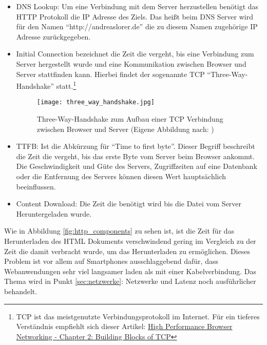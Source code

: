 			\begin{itemize}
				\item DNS Lookup: Um eine Verbindung mit dem Server herzustellen benötigt das HTTP Protokoll die IP Adresse des Ziels. Das heißt beim DNS Server wird für den Namen "`http://andreaslorer.de"' die zu diesem Namen zugehörige IP Adresse zurückgegeben.

				\item Initial Connection bezeichnet die Zeit die vergeht, bis eine Verbindung zum Server hergestellt wurde und eine Kommunikation zwischen Browser und Server stattfinden kann. Hierbei findet der sogenannte TCP "`Three-Way-Handshake"' statt.\footnote{TCP ist das meistgenutzte Verbindungsprotokoll im Internet. Für ein tieferes Verständnis empfiehlt sich dieser Artikel: \href{http://chimera.labs.oreilly.com/books/1230000000545/ch02.html}{High Performance Browser Networking - Chapter 2: Building Blocks of TCP}}

				\begin{figure}[htbp]
					\begin{center}
						\texttt{[image: three\_way\_handshake.jpg]}
						\caption{Three-Way-Handshake zum Aufbau einer TCP Verbindung zwischen Browser und Server (Eigene Abbildung nach: \autocite{bos})}
						\label{fig:three_way_handshake}
					\end{center}
				\end{figure}

				\item TTFB: Ist die Abkürzung für "`Time to first byte"'. Dieser Begriff beschreibt die Zeit die vergeht, bis das erste Byte vom Server beim Browser ankommt. Die Geschwindigkeit und Güte des Servers, Zugriffzeiten auf eine Datenbank oder die Entfernung des Servers können diesen Wert hauptsächlich beeinflussen.

				\item Content Download: Die Zeit die benötigt wird bis die Datei vom Server Heruntergeladen wurde.
			\end{itemize}

			Wie in Abbildung \ref{fig:http_components} zu sehen ist, ist die Zeit für das Herunterladen des HTML Dokuments verschwindend gering im Vergleich zu der Zeit die damit verbracht wurde, um das Herunterladen zu ermöglichen. Dieses Problem ist vor allem auf Smartphones ausschlaggebend dafür, dass Webanwendungen sehr viel langsamer laden als mit einer Kabelverbindung. Das Thema wird in Punkt \ref{sec:netzwerke}: Netzwerke und Latenz noch ausführlicher behandelt.
					
